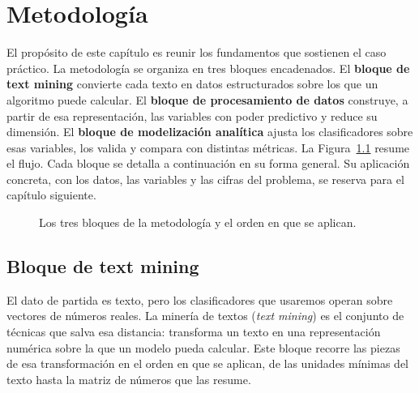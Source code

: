 \documentclass[12pt,a4paper]{report}
\theoremstyle{definition}
\begin{document}
\chapter{Metodología}

El propósito de este capítulo es reunir los fundamentos que sostienen el
caso práctico. La metodología se organiza en tres bloques encadenados. El \textbf{bloque de text
mining} convierte cada texto en datos estructurados sobre los que un algoritmo puede calcular. El
\textbf{bloque de procesamiento de datos} construye, a partir de esa representación, las variables con
poder predictivo y reduce su dimensión. El \textbf{bloque de modelización analítica} ajusta los
clasificadores sobre esas variables, los valida y compara con distintas métricas. La
Figura~\ref{fig:bloques} resume el flujo. Cada bloque se detalla a continuación en su forma general.
Su aplicación concreta, con los datos, las variables y las cifras del problema, se reserva para el
capítulo siguiente.

\begin{figure}[H]
\centering
{}
\caption{Los tres bloques de la metodología y el orden en que se aplican.}
\label{fig:bloques}
\end{figure}

\section{Bloque de text mining}
\label{sec:textmining}

El dato de partida es texto, pero los clasificadores que usaremos operan sobre vectores de números
reales. La minería de textos (\emph{text mining}) \cite{aggarwal2012textmining} es el conjunto de
técnicas que salva esa distancia: transforma un texto en una representación numérica sobre la que un
modelo pueda calcular. Este bloque recorre las piezas de esa transformación en el orden en que se
aplican, de las unidades mínimas del texto hasta la matriz de números que las resume.
\end{document}
